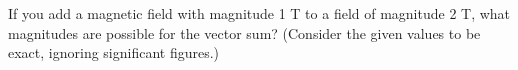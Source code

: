 If you add a magnetic field with magnitude 1 T to a field of magnitude 2 T,
what magnitudes are possible for the vector sum? (Consider the given values to
be exact, ignoring significant figures.)


